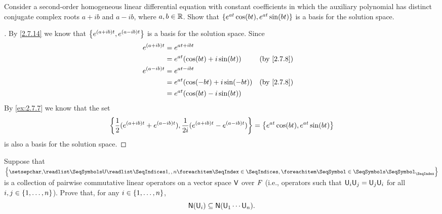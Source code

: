 \begin{ex}\label{ex:2.7.8}
	Consider a second-order homogeneous linear differential equation with constant coefficients in which the auxiliary polynomial has distinct conjugate complex roots \(a + ib\) and \(a - ib\), where \(a, b \in \mathbb{R}\).
	Show that \(\left\lbrace e^{at} \cos(bt), e^{at} \sin(bt)\right\rbrace\) is a basis for the solution space.
\end{ex}

\begin{proof}[]
	By \cref{2.7.14} we know that \(\left\lbrace e^{(a + ib) t}, e^{(a - ib) t}\right\rbrace\) is a basis for the solution space.
	Since
	\begin{align*}
		e^{(a + ib) t} & = e^{at + ibt}                                     \\
		               & = e^{at} (\cos(bt) + i \sin(bt))   &  & \by{2.7.8} \\
		e^{(a - ib) t} & = e^{at - ibt}                                     \\
		               & = e^{at} (\cos(-bt) + i \sin(-bt)) &  & \by{2.7.8} \\
		               & = e^{at} (\cos(bt) - i \sin(bt))
	\end{align*}
	By \cref{ex:2.7.7} we know that the set
	\[
		\left\lbrace\frac{1}{2} (e^{(a + ib) t} + e^{(a - ib) t}), \frac{1}{2i} (e^{(a + ib) t} - e^{(a - ib) t})\right\rbrace = \left\lbrace e^{at} \cos(bt), e^{at} \sin(bt)\right\rbrace
	\]
	is also a basis for the solution space.
\end{proof}

\begin{ex}\label{ex:2.7.9}
	Suppose that \(\set{\seq{\U}{1,,n}}\) is a collection of pairwise commutative linear operators on a vector space \(\mathsf{V}\) over \(\mathit{F}\)
	(i.e., operators such that \(\mathsf{U}_i \mathsf{U}_j = \mathsf{U}_j \mathsf{U}_i\) for all \(i, j \in \left\lbrace1, \dots, n\right\rbrace\)).
	Prove that, for any \(i \in \left\lbrace1, \dots, n\right\rbrace\),
	\[
		\ns{\U_i} \subseteq \ns{\U_1 \cdots \U_n}.
	\]
\end{ex}

